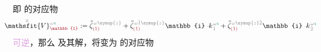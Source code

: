 即  的对应物
\begin{align} \label{eq:plane_wave_basis-V1}
	\Xint{\mathcolor{gray}{-}}{25}{\bar{\bar{\mathsfit{V}}}}^{\;\! \mathcolor{gray}{\omega} \textcolor{PineGreen}{\imath}}_{\textcolor{Maroon}{\mathbb{1}}} := \bar{\bar{\zeta}}^{\;\! \mathcolor{gray}{\omega} \mathcolor{gray}{\symup{z}}}_{\textcolor{Maroon}{(1)}} + \bar{\bar{\zeta}}^{\;\! \mathcolor{gray}{\omega} \mathcolor{gray}{\check{1} \symup{z}}}_{\textcolor{Maroon}{(1)}} \mathbb{i} \Xint{\begin{smallmatrix} ~ \\ {}^{}_{\mathcolor{gray}{-}} \\ ~ \end{smallmatrix}}{15}{k}_{\;\! \mathcolor{gray}{\check{1}}}^{\;\! \mathcolor{gray}{\omega} \textcolor{PineGreen}{\imath}} + \bar{\bar{\zeta}}^{\;\! \mathcolor{gray}{\omega} \mathcolor{gray}{\symup{z} \check{2}}}_{\textcolor{Maroon}{(1)}} \mathbb{i} \Xint{\begin{smallmatrix} ~ \\ {}^{}_{\mathcolor{gray}{-}} \\ ~ \end{smallmatrix}}{15}{k}_{\;\! \mathcolor{gray}{\check{2}}}^{\;\! \mathcolor{gray}{\omega} \textcolor{PineGreen}{\imath}}
\end{align}
\textcolor{Plum}{可逆}，那么  及其解，将变为  的对应物
